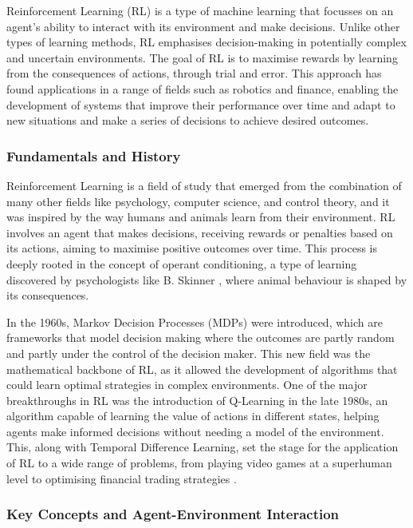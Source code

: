 Reinforcement Learning (RL) is a type of machine learning that focusses on an agent's ability to interact with its environment and make decisions. Unlike other types of learning methods, RL emphasises decision-making in potentially complex and uncertain environments. The goal of RL is to maximise rewards by learning from the consequences of actions, through trial and error. This approach has found applications in a range of fields such as robotics and finance, enabling the development of systems that improve their performance over time and adapt to new situations and make a series of decisions to achieve desired outcomes.

\subsubsection{Fundamentals and History}

Reinforcement Learning is a field of study that emerged from the combination of many other fields like psychology, computer science, and control theory, and it was inspired by the way humans and animals learn from their environment. RL involves an agent that makes decisions, receiving rewards or penalties based on its actions, aiming to maximise positive outcomes over time. This process is deeply rooted in the concept of operant conditioning, a type of learning discovered by psychologists like B. Skinner \cite{skinner_operant_1963}, where animal behaviour is shaped by its consequences. 

In the 1960s, Markov Decision Processes (MDPs) were introduced, which are frameworks that model decision making where the outcomes are partly random and partly under the control of the decision maker. This new field was the mathematical backbone of RL, as it allowed the development of algorithms that could learn optimal strategies in complex environments. One of the major breakthroughs in RL was the introduction of Q-Learning in the late 1980s, an algorithm capable of learning the value of actions in different states, helping agents make informed decisions without needing a model of the environment. This, along with Temporal Difference Learning, set the stage for the application of RL to a wide range of problems, from playing video games at a superhuman level to optimising financial trading strategies \cite{sutton_reinforcement_2018}.

\subsubsection{Key Concepts and Agent-Environment Interaction}

